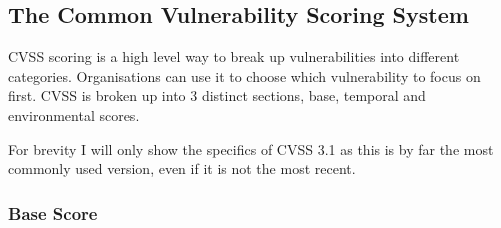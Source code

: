 \documentclass[12pt]{article}
\begin{document}
\subsection*{The Common Vulnerability Scoring System}

CVSS scoring is a high level way to break up vulnerabilities into different categories.
Organisations can use it to choose which vulnerability to focus on first. CVSS is broken up into 3
distinct sections, base, temporal and environmental scores.

For brevity I will only show the specifics of CVSS 3.1 \cite{CVSS_31}as this is by far the most commonly used
version, even if it is not the most recent.

\subsubsection*{Base Score}
\end{document}
